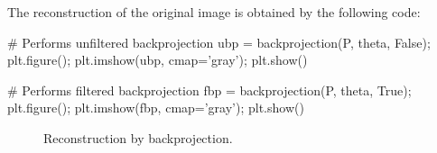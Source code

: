 The reconstruction of the original image is obtained by the following code:
\begin{python}
# Performs unfiltered backprojection
ubp = backprojection(P, theta, False);
plt.figure();
plt.imshow(ubp, cmap='gray');
plt.show()

# Performs filtered backprojection
fbp = backprojection(P, theta, True);
plt.figure();
plt.imshow(fbp, cmap='gray');
plt.show()
\end{python}

\begin{figure}[htbp]
 \centering
 
 \hfill
  \hfill
 \caption{Reconstruction by backprojection.}
 \label{fig:tomography:python:backprojection}
\end{figure}

